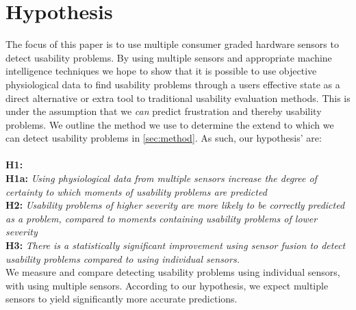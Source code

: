 \section{Hypothesis}
The focus of this paper is to use multiple consumer graded hardware sensors to detect usability problems. 
By using multiple sensors and appropriate machine intelligence techniques we hope to show that it is possible to use objective physiological data to find usability problems through a users effective state as a direct alternative or extra tool to traditional usability evaluation methods. 
This is under the assumption that we \textit{can} predict frustration and thereby usability problems.
We outline the method we use to determine the extend to which we can detect usability problems in \ref{sec:method}.
As such, our hypothesis' are:\\\\

\newcommand{\hypo}[2]{%
  \textbf{H#1:} \textit{#2} \\
}
\hypo{1}{}

\hypo{1a}{Using physiological data from multiple sensors increase the degree of certainty to which moments of usability problems are predicted}

\hypo{2}{Usability problems of higher severity are more likely to be correctly predicted as a problem, compared to
moments containing usability problems of lower severity}

\hypo{3}{There is a statistically significant improvement using sensor fusion to detect usability problems compared to using individual sensors.}




We measure and compare detecting usability problems using individual sensors, with using multiple sensors. According to
our hypothesis, we expect multiple sensors to yield significantly more accurate predictions.
